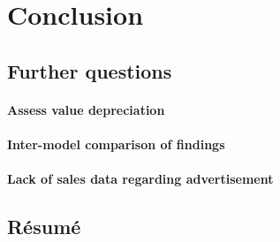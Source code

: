 \chapter{Conclusion}
\section{Further questions}
\subsubsection{Assess value depreciation}
\subsubsection{Inter-model comparison of findings}
\subsubsection{Lack of sales data regarding advertisement}
\section{Résumé}
   